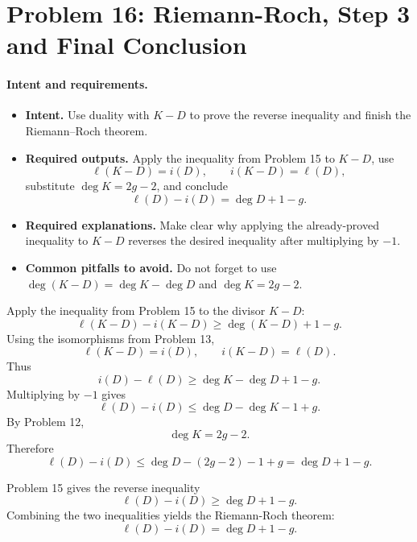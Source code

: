 \documentclass[11pt]{article}
\newenvironment{intentrequirements}{%
\paragraph{Intent and requirements.}
\begin{itemize}[leftmargin=*, itemsep=0.25em]
}{%
\end{itemize}
}
\begin{document}
\section*{Problem 16: Riemann-Roch, Step 3 and Final Conclusion}

\begin{intentrequirements}
\item \textbf{Intent.} Use duality with $K-D$ to prove the reverse inequality and finish the Riemann--Roch theorem.
\item \textbf{Required outputs.} Apply the inequality from Problem 15 to $K-D$, use
\[
 \ell(K-D)=i(D),\qquad i(K-D)=\ell(D),
\]
substitute $\deg K=2g-2$, and conclude
\[
 \ell(D)-i(D)=\deg D+1-g.
\]
\item \textbf{Required explanations.} Make clear why applying the already-proved inequality to $K-D$ reverses the desired inequality after multiplying by $-1$.
\item \textbf{Common pitfalls to avoid.} Do not forget to use $\deg(K-D)=\deg K-\deg D$ and $\deg K=2g-2$.
\end{intentrequirements}

Apply the inequality from Problem 15 to the divisor $K-D$:
\[
 \ell(K-D)-i(K-D)\geq \deg(K-D)+1-g.
\]
Using the isomorphisms from Problem 13,
\[
 \ell(K-D)=i(D),
\qquad
 i(K-D)=\ell(D).
\]
Thus
\[
 i(D)-\ell(D)\geq \deg K-\deg D+1-g.
\]
Multiplying by $-1$ gives
\[
 \ell(D)-i(D)\leq \deg D-\deg K-1+g.
\]
By Problem 12,
\[
 \deg K=2g-2.
\]
Therefore
\[
 \ell(D)-i(D)
 \leq
 \deg D-(2g-2)-1+g
 =
 \deg D+1-g.
\]

Problem 15 gives the reverse inequality
\[
 \ell(D)-i(D)\geq \deg D+1-g.
\]
Combining the two inequalities yields the Riemann-Roch theorem:
\[
 \boxed{\ell(D)-i(D)=\deg D+1-g.}
\]
\end{document}
